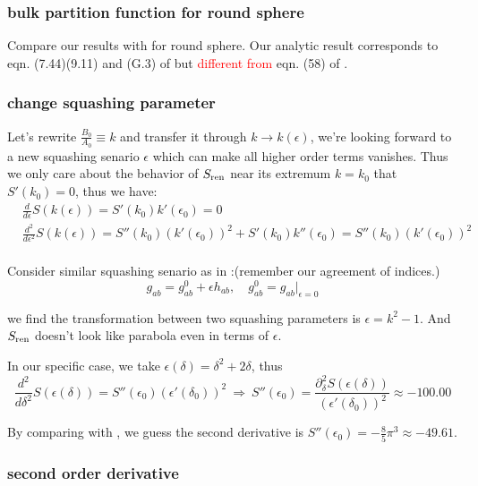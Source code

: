 \documentclass[12pt, a4paper]{article}
\numberwithin{equation}{section}
\newcommand{\be}{\begin{equation}}
\newcommand{\ee}{\end{equation}}
\begin{document}
\subsubsection{bulk partition function for round sphere}	
Compare our results with \cite{Khodam:2009eg}\cite{Cano:2019hh} for round sphere. Our analytic result corresponds to eqn. (7.44)(9.11) and (G.3) of \cite{Cano:2019hh} but \textcolor{red}{different from} eqn. (58) of \cite{Khodam:2009eg}.

	\subsubsection{change squashing parameter}
	Let's rewrite $\frac{B_0}{A_0}\equiv k$ and transfer it through $k\rightarrow k(\epsilon)$, we're looking forward to a new squashing senario $\epsilon$ which can make all higher order terms vanishes. Thus we only care about the behavior of $S_{\rm ren}$ near its extremum $k=k_0$ that $S'(k_0) = 0$, thus we have:
\be
\begin{aligned}
	&\frac{d}{d\epsilon}S(k(\epsilon)) = S'(k_0)k'(\epsilon_0) = 0&\\
	&\frac{d^2}{d\epsilon^2}S(k(\epsilon)) = S''(k_0)(k'(\epsilon_0))^2 + S'(k_0)k''(\epsilon_0) = S''(k_0)(k'(\epsilon_0))^2&\\
\end{aligned}
\ee	

	Consider similar squashing senario as in \cite{Bobev:2017pf}:(remember our agreement of indices.)
\be
	g_{ab} = g_{ab}^0 + \epsilon h_{ab},\quad g_{ab}^0 = g_{ab}\Big|_{\epsilon=0}
\ee
	
	we find the transformation between two squashing parameters is $\epsilon = k^2-1$. And $S_{\rm ren}$ doesn't look like parabola even in terms of $\epsilon$. 
	
	In our specific case, we take $\epsilon(\delta) = \delta^2+2\delta$, thus
\be
	\frac{d^2}{d\delta^2}S(\epsilon(\delta)) = S''(\epsilon_0)(\epsilon'(\delta_0))^2\ \Rightarrow \ S''(\epsilon_0) = \frac{\partial_\delta^2S(\epsilon(\delta))}{(\epsilon'(\delta_0))^2} \approx -100.00
\ee

	By comparing with \cite{Bueno:2018pf}, we guess the second derivative is $S''(\epsilon_0)=-\frac{8}{5}\pi^3\approx -49.61$.

	
	\subsubsection{second order derivative}
	
\end{document}
